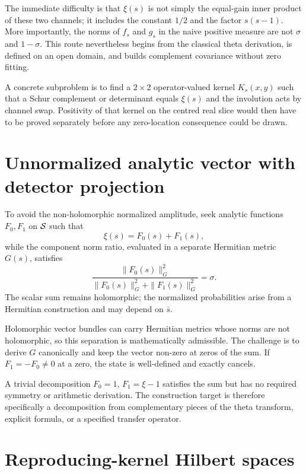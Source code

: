 The immediate difficulty is that $\xi(s)$ is not simply the equal-gain inner product of these two channels; it includes the constant $1/2$ and the factor $s(s-1)$. More importantly, the norms of $f_s$ and $g_s$ in the naive positive measure are not $\sigma$ and $1-\sigma$. This route nevertheless begins from the classical theta derivation, is defined on an open domain, and builds complement covariance without zero fitting.

A concrete subproblem is to find a $2\times2$ operator-valued kernel $K_s(x,y)$ such that a Schur complement or determinant equals $\xi(s)$ and the involution acts by channel swap. Positivity of that kernel on the centred real slice would then have to be proved separately before any zero-location consequence could be drawn.

\section{Unnormalized analytic vector with detector projection}

To avoid the non-holomorphic normalized amplitude, seek analytic functions $F_0,F_1$ on $\mathcal{S}$ such that
\begin{equation}
 \xi(s)=F_0(s)+F_1(s),
 \label{eq:analytic-two-sum}
\end{equation}
while the component norm ratio, evaluated in a separate Hermitian metric $G(s)$, satisfies
\begin{equation}
 \frac{\|F_0(s)\|_G^2}{\|F_0(s)\|_G^2+\|F_1(s)\|_G^2}=\sigma.
 \label{eq:derived-weight-ratio}
\end{equation}
The scalar sum remains holomorphic; the normalized probabilities arise from a Hermitian construction and may depend on $\bar s$.

Holomorphic vector bundles can carry Hermitian metrics whose norms are not holomorphic, so this separation is mathematically admissible. The challenge is to derive $G$ canonically and keep the vector non-zero at zeros of the sum. If $F_1=-F_0\neq0$ at a zero, the state is well-defined and exactly cancels.

A trivial decomposition $F_0=1$, $F_1=\xi-1$ satisfies the sum but has no required symmetry or arithmetic derivation. The construction target is therefore specifically a decomposition from complementary pieces of the theta transform, explicit formula, or a specified transfer operator.

\section{Reproducing-kernel Hilbert spaces}

